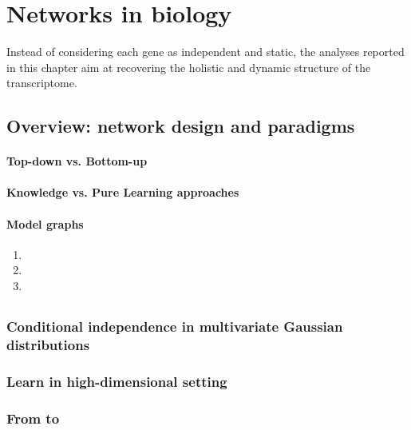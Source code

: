 \section{Networks in biology}
Instead of considering each gene as independent and static, the analyses reported in this chapter aim at recovering the holistic and dynamic structure of the transcriptome.

\subsection{Overview: network design and paradigms}

\paragraph{Top-down vs. Bottom-up}
\paragraph{Knowledge vs. Pure Learning approaches}
\paragraph{Model graphs}

\begin{enumerate}[label=\alph*)]
\item[Boolean networks:]
\item[Random networks:]
\item[Mechanistic networks:]

\end{enumerate}

\subsection{}
\subsubsection{Conditional independence in multivariate Gaussian distributions}
\subsubsection{Learn  in high-dimensional setting}
\subsubsection{From  to }

